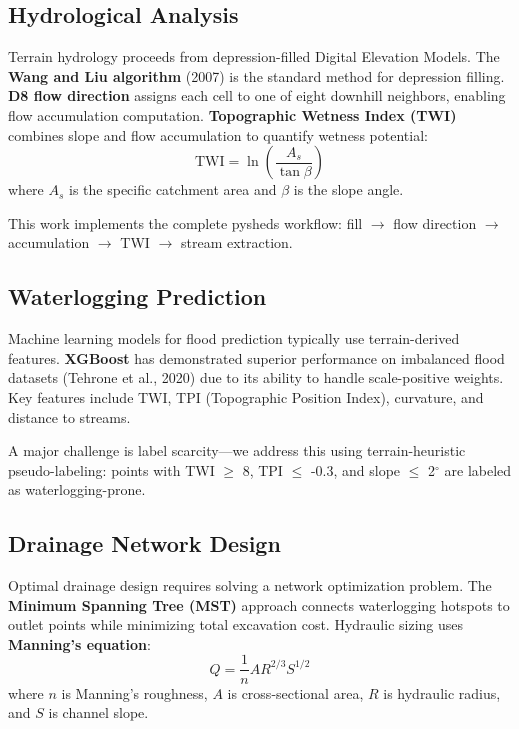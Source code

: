 \documentclass[a4paper,12pt]{article}
\begin{document}
\subsection{Hydrological Analysis}

Terrain hydrology proceeds from depression-filled Digital Elevation Models. The \textbf{Wang and Liu algorithm} (2007) is the standard method for depression filling. \textbf{D8 flow direction} assigns each cell to one of eight downhill neighbors, enabling flow accumulation computation. \textbf{Topographic Wetness Index (TWI)} combines slope and flow accumulation to quantify wetness potential:
\begin{equation}
	\text{TWI} = \ln\left(\frac{A_s}{\tan\beta}\right)
\end{equation}
where $A_s$ is the specific catchment area and $\beta$ is the slope angle.

This work implements the complete pysheds workflow: fill $\rightarrow$ flow direction $\rightarrow$ accumulation $\rightarrow$ TWI $\rightarrow$ stream extraction.

\subsection{Waterlogging Prediction}

Machine learning models for flood prediction typically use terrain-derived features. \textbf{XGBoost} has demonstrated superior performance on imbalanced flood datasets (Tehrone et al., 2020) due to its ability to handle scale-positive weights. Key features include TWI, TPI (Topographic Position Index), curvature, and distance to streams.

A major challenge is label scarcity---we address this using terrain-heuristic pseudo-labeling: points with TWI $\ge$ 8, TPI $\le$ -0.3, and slope $\le$ 2$^\circ$ are labeled as waterlogging-prone.

\subsection{Drainage Network Design}

Optimal drainage design requires solving a network optimization problem. The \textbf{Minimum Spanning Tree (MST)} approach connects waterlogging hotspots to outlet points while minimizing total excavation cost. Hydraulic sizing uses \textbf{Manning's equation}:
\begin{equation}
	Q = \frac{1}{n} A R^{2/3} S^{1/2}
\end{equation}
where $n$ is Manning's roughness, $A$ is cross-sectional area, $R$ is hydraulic radius, and $S$ is channel slope.
\end{document}
